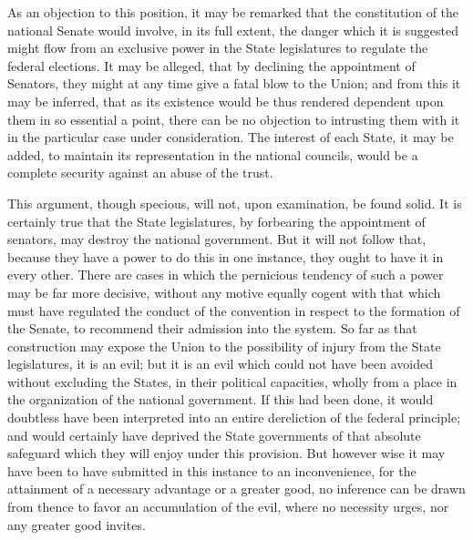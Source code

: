 As an objection to this position, it may be remarked that the constitution of the national Senate would involve, in its full extent, the danger which it is suggested might flow from an exclusive power in the State legislatures to regulate the federal elections. 
It may be alleged, that by declining the appointment of Senators, they might at any time give a fatal blow to the Union; and from this it may be inferred, that as its existence would be thus rendered dependent upon them in so essential a point, there can be no objection to intrusting them with it in the particular case under consideration. 
The interest of each State, it may be added, to maintain its representation in the national councils, would be a complete security against an abuse of the trust.

This argument, though specious, will not, upon examination, be found solid. 
It is certainly true that the State legislatures, by forbearing the appointment of senators, may destroy the national government. 
But it will not follow that, because they have a power to do this in one instance, they ought to have it in every other. 
There are cases in which the pernicious tendency of such a power may be far more decisive, without any motive equally cogent with that which must have regulated the conduct of the convention in respect to the formation of the Senate, to recommend their admission into the system. 
So far as that construction may expose the Union to the possibility of injury from the State legislatures, it is an evil; but it is an evil which could not have been avoided without excluding the States, in their political capacities, wholly from a place in the organization of the national government. 
If this had been done, it would doubtless have been interpreted into an entire dereliction of the federal principle; and would certainly have deprived the State governments of that absolute safeguard which they will enjoy under this provision. 
But however wise it may have been to have submitted in this instance to an inconvenience, for the attainment of a necessary advantage or a greater good, no inference can be drawn from thence to favor an accumulation of the evil, where no necessity urges, nor any greater good invites.

